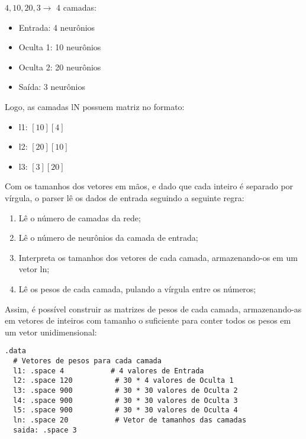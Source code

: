 \documentclass[12pt]{article}
\begin{document}
\begin{tcolorbox}[
  colframe=blue!30!white,  %
  colback=white,             %
  boxrule=0.8pt,            %
  arc=1mm,                  %
  left=6pt,                 %
  right=6pt,                %
  top=6pt,                  %
  bottom=6pt                %
]{
  
  $ 4, 10, 20, 3 \rightarrow $ 4 camadas:
  \begin{itemize}
      \item Entrada: 4 neurônios
      \item Oculta 1: 10 neurônios
      \item Oculta 2: 20 neurônios
      \item Saída: 3 neurônios
  \end{itemize}
  
  Logo, as camadas lN possuem matriz no formato:
  
  \begin{itemize}
      \item l1: $[10][4]$
      \item l2: $[20][10]$
      \item l3: $[3][20]$
  \end{itemize}
}\end{tcolorbox}  

Com os tamanhos dos vetores em mãos, e dado que cada inteiro é separado por vírgula, o parser lê os dados de entrada seguindo a seguinte regra:

\begin{enumerate}
  \item Lê o número de camadas da rede;
  \item Lê o número de neurônios da camada de entrada;
  \item Interpreta os tamanhos dos vetores de cada camada, armazenando-os em um vetor ln;
  \item Lê os pesos de cada camada, pulando a vírgula entre os números;
\end{enumerate}

\hspace{2em}Assim, é possível construir as matrizes de pesos de cada camada, armazenando-as em vetores de inteiros com tamanho o suficiente para conter todos os pesos em um vetor unidimensional:


\begin{lstlisting}[style=meucodigo]
.data
  # Vetores de pesos para cada camada
  l1: .space 4           # 4 valores de Entrada
  l2: .space 120          # 30 * 4 valores de Oculta 1
  l3: .space 900          # 30 * 30 valores de Oculta 2
  l4: .space 900          # 30 * 30 valores de Oculta 3
  l5: .space 900          # 30 * 30 valores de Oculta 4
  ln: .space 20           # Vetor de tamanhos das camadas
  saida: .space 3
\end{lstlisting}
\end{document}
